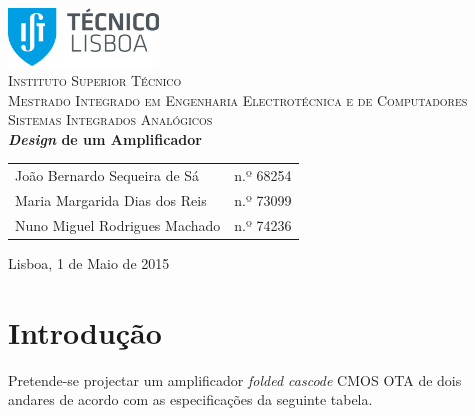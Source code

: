 \documentclass[11pt]{article}
\numberwithin{equation}{section}
\begin{document}
\begin{titlepage}
\begin{center}

\hfill \break
\hfill \break

\includegraphics[width=0.3\textwidth]{./logo}~\\[1cm]

\textsc{\LARGE Instituto Superior Técnico}\\[0.25cm]
\textsc{\Large Mestrado Integrado em Engenharia Electrotécnica e de Computadores}\\[1.8cm]
\textsc{\huge Sistemas Integrados Analógicos}\\[0.25cm]

{\huge \bfseries \textit{Design} de um Amplificador \\[1cm]}

\begin{tabular}{ l l }
João Bernardo Sequeira de Sá & \hspace{2mm} n.º 68254 \\
Maria Margarida Dias dos Reis & \hspace{2mm} n.º 73099 \\
Nuno Miguel Rodrigues Machado & \hspace{2mm} n.º 74236
\end{tabular}

\vfill

{\large Lisboa, 1 de Maio de 2015} 

\end{center}
\end{titlepage}

\clearpage

\tableofcontents
\pagebreak

\clearpage
{}

\section{Introdução}

Pretende-se projectar um amplificador \textit{folded cascode} CMOS OTA de dois andares de acordo com as especificações da seguinte tabela.
\end{document}
